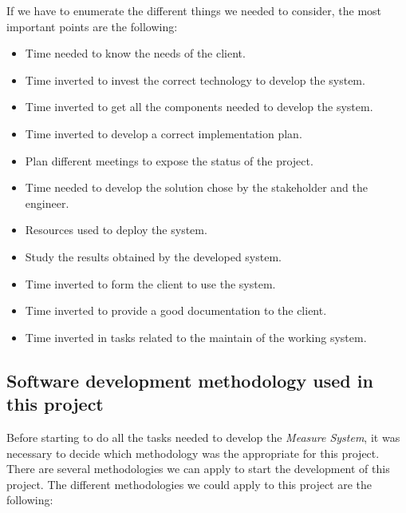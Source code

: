 If we have to enumerate the different things we needed to consider, the most important points are the following:

\begin{itemize}
\item Time needed to know the needs of the client.
\item Time inverted to invest the correct technology to develop the system.
\item Time inverted to get all the components needed to develop the system.
\item Time inverted to develop a correct implementation plan.
\item Plan different meetings to expose the status of the project.
\item Time needed to develop the solution chose by the stakeholder and the engineer.
\item Resources used to deploy the system.
\item Study the results obtained by the developed system.
\item Time inverted to form the client to use the system.
\item Time inverted to provide a good documentation to the client.
\item Time inverted in tasks related to the maintain of the working system.
\end{itemize}

\subsection{Software development methodology used in this project}

Before starting to do all the tasks needed to develop the \textit{Measure System}, it was necessary to decide which methodology was the appropriate for this project. There are several methodologies we can apply to start the development of this project. The different methodologies we could apply to this project are the following:

